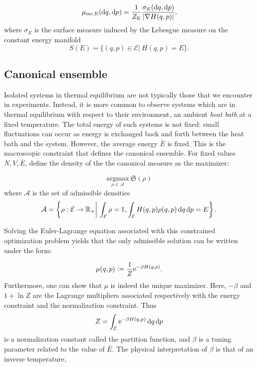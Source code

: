     \begin{equation}
        \label{eq:microcanonical_measure}
        \mu_{\mathrm{mc,E}}(\mathrm{d} q,\mathrm{d} p)=\frac 1{Z_{\mathrm{E}}}\frac{\sigma_{E}(\mathrm{d} q,\mathrm{d} p)}{|\nabla H(q,p)|},
    \end{equation}
    where $\sigma_{E}$ is the surface measure induced by the Lebesgue measure on the constant energy manifold
    \begin{equation}
        \label{eq:constant_energy_manifold}
        S(E) = \{ (q,p) \in \mathcal E |\ H(q,p) = E\}.\end{equation}


\subsection{Canonical ensemble}\label{par:canonical ensemble}
    Isolated systems in thermal equilibrium are not typically those that we encounter in experiments. Instead, it is more common to observe systems which are in thermal equilibrium with respect to their environment, an ambient \textit{heat bath} at a fixed temperature.
    The total energy of such systems is not fixed: small fluctuations can occur as energy is exchanged back and forth between the heat bath and the system. However, the average energy $\bar E$ is fixed. 
    This is the macroscopic constraint that defines the canonical ensemble. For fixed values $N,V,\bar E$, define the density of the the canonical measure as the maximizer:

    $$ \underset{\rho \in \mathcal A}{\mathrm{argmax}}\ \mathfrak S(\rho)$$
    where $\mathcal A$ is the set of admissible densities
    $$\mathcal A=\left\{ \rho: \mathcal E \to \mathbb{R}_+ \middle|\ \int_{\mathcal E} \rho =1, \int_{\mathcal E} H(q,p)\rho(q,p)\,\mathrm{d} q \,\mathrm{d} p=E \right\}.$$

    Solving the Euler-Lagrange equation associated with this constrained optimization problem yields that the only admissible solution can be written under the form:

    \begin{equation}\label{eq:canonical_measure}\mu(q,p) \mathrel{\mathop:}= \frac 1{Z} \mathrm{e}^{-\beta H(q,p)}.\end{equation}
    Furthermore, one can show that $\mu$ is indeed the unique maximizer.
    Here, $-\beta$ and $1+\ln Z$ are the Lagrange multipliers associated respectively with the energy constraint and the normalization constraint. Thus
    $$Z=\int_{\mathcal E} \mathrm{e}^{-\beta H(q,p)}\,\mathrm{d} q\,\mathrm{d} p$$
    is a normalization constant called the partition function, and $\beta$ is a tuning parameter related to the value of $\bar E$. The physical interpretation of $\beta$ is that of an inverse temperature,

